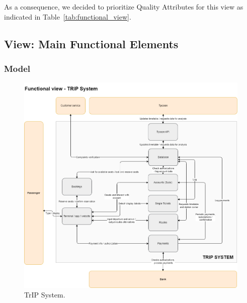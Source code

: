 As a consequence, we decided to prioritize Quality Attributes for this view as indicated in Table~\ref{tab:functional_view}.
\begin{table}[h!]
    \centering
    \caption{Functional View Prioritized Quality Attributes}
    \label{tab:functional_view}
\end{table}


\subsection{View: Main Functional Elements}

\subsubsection{Model}

\begin{figure}[H]
    \centering
    \includegraphics[width=\textwidth]{drawings/views_final_version/functional_view.png}
    \caption{TrIP System.}
    \label{fig:trip_system}
\end{figure}

